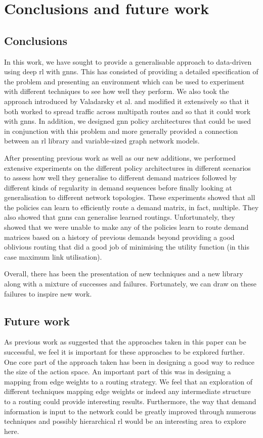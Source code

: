 \chapter{Conclusions and future work}
\label{chapter:conclusions}

\section{Conclusions}
In this work, we have sought to provide a generalisable approach to data-driven using deep \ac{rl} with \acp{gnn}. This has consisted of providing a detailed specification of the problem and presenting an environment which can be used to experiment with different techniques to see how well they perform. We also took the approach introduced by Valadarsky et al. and modified it extensively so that it both worked to spread traffic across multipath routes and so that it could work with \acp{gnn}. In addition, we designed \ac{gnn} policy architectures that could be used in conjunction with this problem and more generally provided a connection between an \ac{rl} library and variable-sized graph network models.

After presenting previous work as well as our new additions, we performed extensive experiments on the different policy architectures in different scenarios to assess how well they generalise to different demand matrices followed by different kinds of regularity in demand sequences before finally looking at generalisation to different network topologies. These experiments showed that all the policies can learn to efficiently route a demand matrix, in fact, multiple. They also showed that \acp{gnn} can generalise learned routings. Unfortunately, they showed that we were unable to make any of the policies learn to route demand matrices based on a history of previous demands beyond providing a good oblivious routing that did a good job of minimising the utility function (in this case maximum link utilisation).

Overall, there has been the presentation of new techniques and a new library along with a mixture of successes and failures. Fortunately, we can draw on these failures to inspire new work.


\section{Future work}
As previous work as suggested that the approaches taken in this paper can be successful, we feel it is important for these approaches to be explored further. One core part of the approach taken has been in designing a good way to reduce the size of the action space. An important part of this was in designing a mapping from edge weights to a routing strategy. We feel that an exploration of different techniques mapping edge weights or indeed any intermediate structure to a routing could provide interesting results. Furthermore, the way that demand information is input to the network could be greatly improved through numerous techniques and possibly hierarchical \ac{rl} would be an interesting area to explore here.

